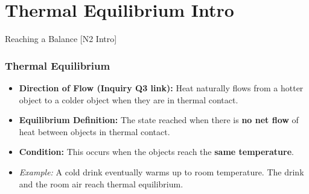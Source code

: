\documentclass[xcolor=svgnames]{beamer}
\begin{document}
\section{Thermal Equilibrium Intro}
\begin{frame}{Reaching a Balance [N2 Intro]}
    \frametitle{Thermal Equilibrium}
    \begin{itemize}
        \item \textbf{Direction of Flow (Inquiry Q3 link):} Heat naturally flows from a hotter object to a colder object when they are in thermal contact.
        \item \textbf{Equilibrium Definition:} The state reached when there is \textbf{no net flow} of heat between objects in thermal contact.
        \item \textbf{Condition:} This occurs when the objects reach the \textbf{same temperature}.
        \item \textit{Example:} A cold drink eventually warms up to room temperature. The drink and the room air reach thermal equilibrium.
    \end{itemize}
    \begin{center}
    \end{center}
\end{frame}
\end{document}
